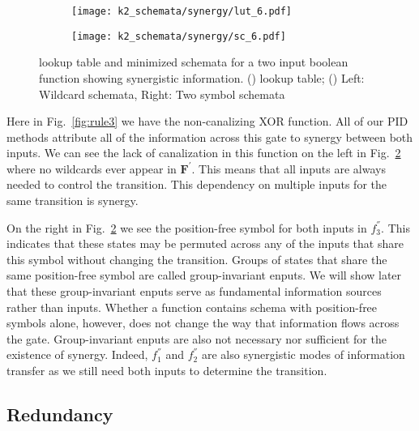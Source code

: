\documentclass[12pt]{article} %
\newcommand{\figref}[1]{Fig.~\ref{fig:#1}}
\begin{document}
\begin{figure}[h]
    \centering
    \begin{subfigure}{0.48\textwidth}
        \centering
        \texttt{[image: k2\_schemata/synergy/lut\_6.pdf]}
        \label{fig:lut6}
        \caption{\label{fig:lut6}}
    \end{subfigure}
    \begin{subfigure}{0.48\textwidth}
        \centering
        \texttt{[image: k2\_schemata/synergy/sc\_6.pdf]}
        \label{fig:ts6}
        \caption{\label{fig:ts6}}
    \end{subfigure}
    \caption{lookup table and minimized schemata for a two input boolean 
    function showing synergistic information.
    () lookup table;
    () Left: Wildcard schemata, Right: Two symbol schemata}
    \label{fig:rule6}
\end{figure}

Here in \figref{rule3} we have the non-canalizing XOR function. All of our PID 
methods attribute all of the information across this gate to synergy between 
both inputs. We can see the lack of canalization in this function on the left 
in \figref{ts6} where no wildcards ever appear in $\mathbf{F^{'}}$. This means 
that all inputs are always needed to control the transition. This dependency on 
multiple inputs for the same transition is synergy.

On the right in \figref{ts6} we see the position-free symbol for both inputs in 
$f^{''}_3$. This indicates that these states may be permuted across any of the 
inputs that share this symbol without changing the transition. Groups of states 
that share the same position-free symbol are called group-invariant enputs. We 
will show later that these group-invariant enputs serve as fundamental 
information sources rather than inputs. Whether a function contains schema with 
position-free symbols alone, however, does not change the way that information 
flows across the gate. Group-invariant enputs are also not necessary nor 
sufficient for the existence of synergy. Indeed, $f^{''}_1$ and $f^{''}_2$ are 
also synergistic modes of information transfer as we still need both inputs to 
determine the transition.

\subsection{Redundancy}
\end{document}
